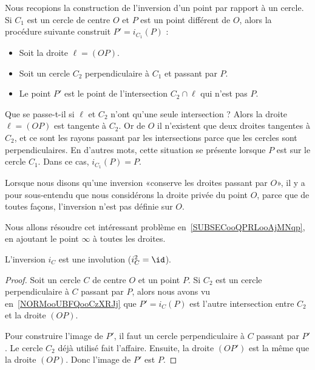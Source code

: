 \begin{normaltext}      \label{NORMooUBFQooCzXRJj}
    Nous recopions la construction de l'inversion d'un point par rapport à un cercle. Si \( C_1\) est un cercle de centre \( O\) et \( P\) est un point différent de \( O\), alors la procédure suivante construit \( P'=i_{C_1}(P)\) :
    \begin{itemize}
        \item Soit la droite \( \ell=(OP)\).
        \item Soit un cercle \( C_2\) perpendiculaire à \( C_1\) et passant par \( P\).
        \item Le point \( P'\) est le point de l'intersection \( C_2\cap\ell\) qui n'est pas \( P\).
    \end{itemize}
    Que se passe-t-il si \( \ell\) et \( C_2\) n'ont qu'une seule intersection ? Alors la droite \( \ell=(OP)\) est tangente à \( C_2\). Or de \( O \) il n'existent que deux droites tangentes à \( C_2\), et ce sont les rayons passant par les intersections parce que les cercles sont perpendiculaires. En d'autres mots, cette situation se présente lorsque \( P\) est sur le cercle \( C_1\). Dans ce cas, \( i_{C_1}(P)=P\).
\end{normaltext}

\begin{remark}
    Lorsque nous disons qu'une inversion «conserve les droites passant par \( O\)», il y a pour sous-entendu que nous considérons la droite privée du point \( O\), parce que de toutes façons, l'inversion n'est pas définie sur \( O\).

    Nous allons résoudre cet intéressant problème en~\ref{SUBSECooQPRLooAjMNqp}, en ajoutant le point \( \infty\) à toutes les droites.
\end{remark}

\begin{corollary}
    L'inversion \( i_C\) est une involution (\( i_C^2=\id\)).
\end{corollary}

\begin{proof}
    Soit un cercle \( C\) de centre \( O\) et un point \( P\). Si \( C_2\) est un cercle perpendiculaire à \( C\) passant par \( P\), alors nous avons vu en~\ref{NORMooUBFQooCzXRJj} que \( P'=i_C(P)\) est l'autre intersection entre \( C_2\) et la droite \( (OP)\).

    Pour construire l'image de \( P'\), il faut un cercle perpendiculaire à \( C\) passant par \( P'\). Le cercle \( C_2\) déjà utilisé fait l'affaire. Ensuite, la droite \( (OP')\) est la même que la droite \( (OP)\). Donc l'image de \( P'\) est \( P\).
\end{proof}

